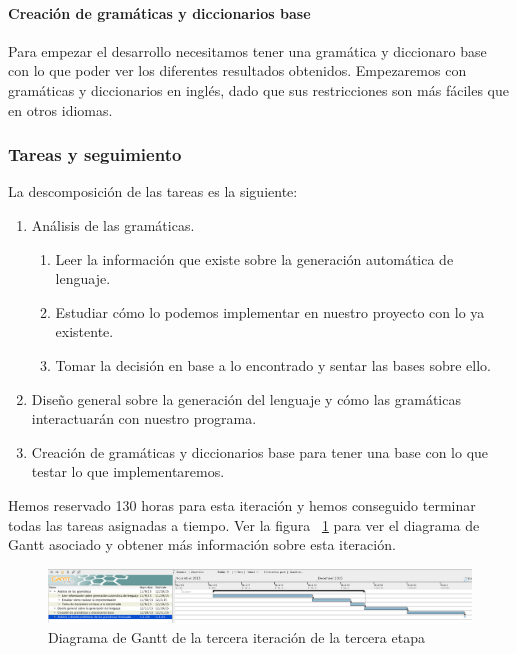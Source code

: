 \paragraph{Creación de gramáticas y diccionarios base} Para empezar el desarrollo necesitamos tener una gramática y diccionaro base con lo que poder ver los diferentes resultados obtenidos. Empezaremos con gramáticas y diccionarios en inglés, dado que sus restricciones son más fáciles que en otros idiomas.

\subsubsection{Tareas y seguimiento}

La descomposición de las tareas es la siguiente:

\begin{enumerate}[label=\bfseries WBS 3.\arabic*]
  \item Análisis de las gramáticas.
    \begin{enumerate}[label=\bfseries WBS 3.1.\arabic*]
      \item Leer la información que existe sobre la generación automática de lenguaje.
      \item Estudiar cómo lo podemos implementar en nuestro proyecto con lo ya existente.
      \item Tomar la decisión en base a lo encontrado y sentar las bases sobre ello.
    \end{enumerate}
  \item Diseño general sobre la generación del lenguaje y cómo las gramáticas interactuarán con nuestro programa.
  \item Creación de gramáticas y diccionarios base para tener una base con lo que testar lo que implementaremos.
\end{enumerate}

Hemos reservado 130 horas para esta iteración y hemos conseguido terminar todas las tareas asignadas a tiempo. Ver la figura ~\ref{fig:sec3it3} para ver el diagrama de Gantt asociado y obtener más información sobre esta iteración.

\begin{figure}
    \includegraphics[width=\textwidth,height=\textheight,keepaspectratio]{./img/sec3it3.png}
  \caption{Diagrama de Gantt de la tercera iteración de la tercera etapa}
  \label{fig:sec3it3}
\end{figure}

